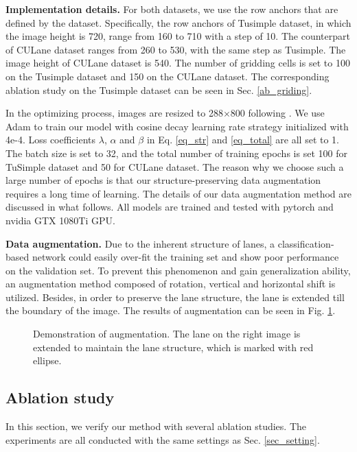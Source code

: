 \documentclass[runningheads]{llncs}
\begin{document}
\noindent
\textbf{Implementation details.} For both datasets, we use the row anchors that are defined by the dataset. Specifically, the row anchors of Tusimple dataset, in which the image height is 720, range from 160 to 710 with a step of 10. The counterpart of CULane dataset ranges from 260 to 530, with the same step as Tusimple. The image height of CULane dataset is 540. The number of gridding cells is set to 100 on the Tusimple dataset and 150 on the CULane dataset. The corresponding ablation study on the Tusimple dataset can be seen in Sec. \ref{ab_griding}. 

In the optimizing process, images are resized to 288$\times$800 following \cite{SCNN}. We use Adam \cite{kingma2014adam} to train our model with cosine decay learning rate strategy \cite{loshchilov2016sgdr} initialized with 4e-4. Loss coefficients $\lambda$, $\alpha$ and $\beta$ in Eq. \ref{eq_str} and \ref{eq_total} are all set to 1. The batch size is set to 32, and the total number of training epochs is set 100 for TuSimple dataset and 50 for CULane dataset. The reason why we choose such a large number of epochs is that our structure-preserving data augmentation requires a long time of learning. The details of our data augmentation method are discussed in what follows. All models are trained and tested with pytorch \cite{paszke2017automatic} and nvidia GTX 1080Ti GPU. 





\noindent
\textbf{Data augmentation.}
Due to the inherent structure of lanes, a classification-based network could easily over-fit the training set and show poor performance on the validation set. To prevent this phenomenon and gain generalization ability, an augmentation method composed of rotation, vertical and horizontal shift is utilized. Besides, in order to preserve the lane structure, the lane is extended till the boundary of the image. The results of augmentation can be seen in Fig. \ref{fig_aug}.
\begin{figure}
	\centering
	\caption{Demonstration of augmentation. The lane on the right image is extended to maintain the lane structure, which is marked with red ellipse.}
	\label{fig_aug}
	\vspace{-10pt}
\end{figure}

\subsection{Ablation study}
In this section, we verify our method with several ablation studies. The experiments are all conducted with the same settings as Sec. \ref{sec_setting}.
\end{document}
